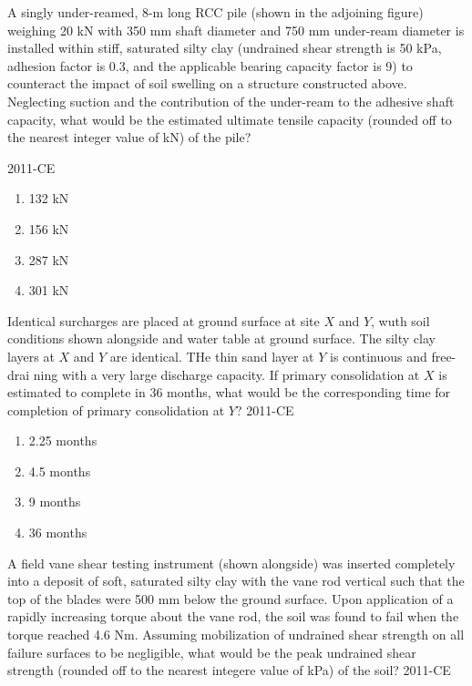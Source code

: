 \item A singly under-reamed, 8-m long RCC pile (shown in the adjoining figure) weighing 20 kN with 350 mm shaft diameter and 750 mm under-ream diameter is installed within stiff, saturated silty clay (undrained shear strength is 50 kPa, adhesion factor is 0.3, and the applicable bearing capacity factor is 9) to counteract the impact of soil swelling on a structure constructed above. Neglecting suction and the contribution of the under-ream to the adhesive shaft capacity, what would be the estimated ultimate tensile capacity (rounded off to the nearest integer value of kN) of the pile?

	\hfill{2011-CE}

\begin{figure}[ht]
\centering

\end{figure}
	\begin{multicols}{4}
	\begin{enumerate}
		\item 132 kN
		\item 156 kN
		\item 287 kN
		\item 301 kN
	\end{enumerate}
	\end{multicols}

\item Identical surcharges are placed at ground surface at site $X$ and $Y$, wuth soil conditions shown alongside and water table at ground surface. The silty clay layers at $X$ and $Y$ are identical. THe thin sand layer at $Y$ is continuous and free-drai ning with a very large discharge capacity. If primary consolidation at $X$ is estimated to complete in 36 months, what would be the corresponding time for completion of primary consolidation at $Y$?
	\hfill{2011-CE}

\begin{figure}[ht]
\centering

\end{figure}
	\begin{multicols}{4}
	\begin{enumerate}
		\item 2.25 months
		\item 4.5 months
		\item 9 months
		\item 36 months
	\end{enumerate}
	\end{multicols}

\item A field vane shear testing instrument (shown alongside) was inserted completely into a deposit of soft, saturated silty clay with the vane rod vertical such that the top of the blades were 500 mm below the ground surface. Upon application of a rapidly increasing torque about the vane rod, the soil was found to fail when the torque reached 4.6 Nm. Assuming mobilization of undrained shear strength on all failure surfaces to be negligible, what would be the peak undrained shear strength (rounded off to the nearest integere value of kPa) of the soil?
	\hfill{2011-CE}

